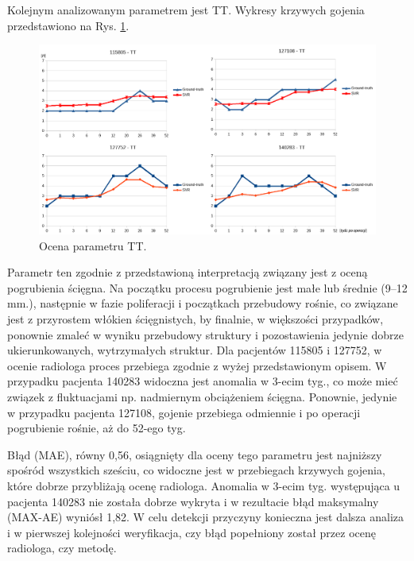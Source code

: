 Kolejnym analizowanym parametrem jest TT. Wykresy krzywych gojenia przedstawiono na Rys. \ref{fig:TT}.    
\begin{figure}[h!]
	\centering
	\includegraphics[width=1\textwidth]{figures/TT.png}
	\caption{Ocena parametru TT.}\label{fig:TT}
\end{figure}
Parametr ten zgodnie z przedstawioną interpretacją związany jest z oceną pogrubienia ścięgna. Na początku procesu pogrubienie jest małe lub średnie (9--12 mm.), następnie w fazie poliferacji i początkach przebudowy rośnie, co związane jest z przyrostem włókien ścięgnistych, by finalnie, w większości przypadków, ponownie zmaleć w wyniku przebudowy struktury i pozostawienia jedynie dobrze ukierunkowanych, wytrzymałych struktur. Dla pacjentów 115805 \linebreak i 127752, w ocenie radiologa proces przebiega zgodnie z wyżej przedstawionym opisem. W przypadku pacjenta 140283 widoczna jest anomalia w 3-ecim tyg., co może mieć związek z fluktuacjami np. nadmiernym obciążeniem ścięgna. Ponownie, jedynie w przypadku pacjenta 127108, gojenie przebiega odmiennie i po operacji pogrubienie rośnie, aż do 52-ego tyg. 

\newpage
Błąd (MAE), równy 0,56, osiągnięty dla oceny tego parametru jest najniższy spośród wszystkich sześciu, co widoczne jest w przebiegach krzywych gojenia, które dobrze przybliżają ocenę radiologa. Anomalia w 3-ecim tyg. występująca u pacjenta 140283 nie została dobrze wykryta i w rezultacie błąd maksymalny (MAX-AE) wyniósł 1,82. W celu detekcji przyczyny konieczna jest dalsza analiza i w pierwszej kolejności weryfikacja, czy błąd popełniony został przez ocenę radiologa, czy metodę.

